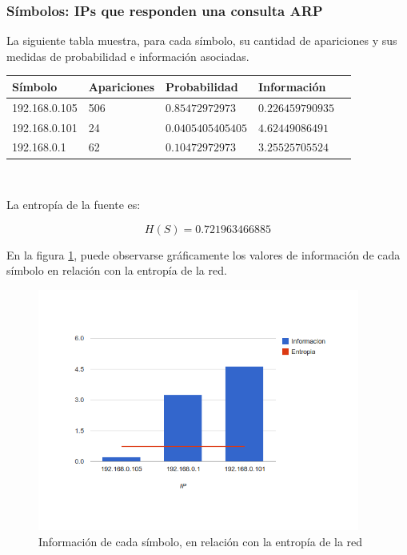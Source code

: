 \documentclass{article}
\begin{document}
%


\subsubsection{Símbolos: IPs que responden una consulta ARP}
La siguiente tabla muestra, para cada símbolo, su cantidad de apariciones y
sus medidas de probabilidad e información asociadas.

\vskip10pt

\begin{tabular}{|l|l|l|l|l|}
  \hline
  Símbolo & Apariciones & Probabilidad & Información \\
  \hline
  192.168.0.105 & 506 & $0.85472972973$ & $0.226459790935$ \\
  \hline
  192.168.0.101 & 24 & $0.0405405405405$ & $4.62449086491$ \\
  \hline
  192.168.0.1 & 62 & $0.10472972973$ & $3.25525705524$ \\
  \hline
\end{tabular}\\

\vskip10pt

La entropía de la fuente es:

$$H(S) = 0.721963466885$$

En la figura \ref{fig:red1repliers:infoentro}, puede observarse gráficamente
los valores de información de cada símbolo en relación con la entropía de la
red.

\begin{figure}[h!]
    \centering                                                       
    \includegraphics[width=300pt]{respuestas1.png}
    \caption{Información de cada símbolo, en relación con la
        entropía de la red}
    \label{fig:red1repliers:infoentro}
\end{figure}
\end{document}

